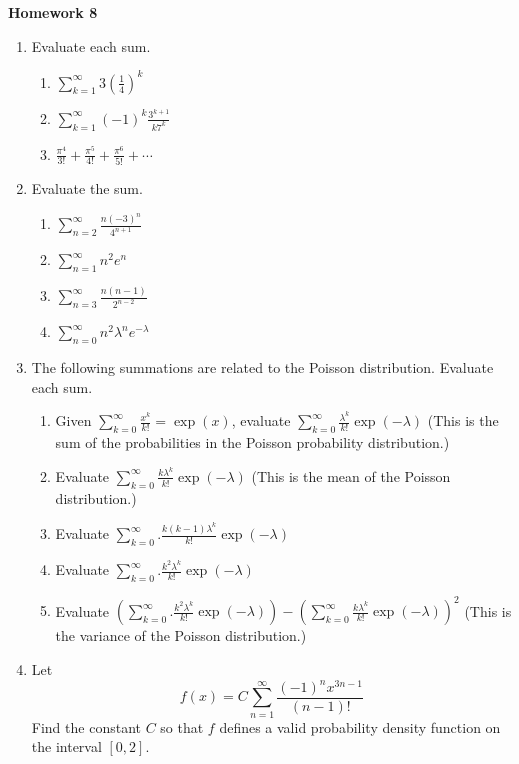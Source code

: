 \documentclass{article}
\begin{document}
\begin{center}
    \large \textbf{Homework 8}
\end{center}
                \begin{enumerate}
                    \item Evaluate each sum.
                        \begin{enumerate}
                            \item $ \sum_{k=1}^\infty 3\left(\frac{1}{4}\right)^k$
                            \item $ \sum_{k=1}^\infty (-1)^{k}\frac{3^{k+1}}{k7^k}$
                            \item $ \frac{\pi^4}{3!}+\frac{\pi^5}{4!}+\frac{\pi^6}{5!}+\cdots$
                        \end{enumerate}
                    \item Evaluate the sum.
                        \begin{enumerate}
                            \item $ \sum_{n=2}^\infty \frac{n(-3)^n}{4^{n+1}}$
                            \item $ \sum_{n=1}^\infty {n^2e^n}$
                            \item $ \sum_{n=3}^\infty \frac{n(n-1)}{2^{n-2}}$
                            \item $ \sum_{n=0}^\infty n^2\lambda^n e^{-\lambda}$ 
                        \end{enumerate}
                    \item The following summations are related to the Poisson distribution.  Evaluate each sum.
                        \begin{enumerate}
                            \item Given $ \sum_{k=0}^\infty \frac{x^k}{k!}=\exp(x)$, evaluate $\sum_{k=0}^\infty \frac{\lambda^k}{k!}\exp(-\lambda)$  (This is the sum of the probabilities in the Poisson probability distribution.)
                            \item Evaluate $ \sum_{k=0}^\infty \frac{k\lambda^k}{k!}\exp(-\lambda)$ (This is the mean of the Poisson distribution.)
                            \item Evaluate $ \sum_{k=0}^\infty. \frac{k(k-1)\lambda^k}{k!}\exp(-\lambda)$
                            \item Evaluate $ \sum_{k=0}^\infty. \frac{k^2\lambda^k}{k!}\exp(-\lambda)$
                            \item Evaluate $ \left( \sum_{k=0}^\infty. \frac{k^2\lambda^k}{k!}\exp(-\lambda)\right) - \left(\sum_{k=0}^\infty \frac{k\lambda^k}{k!}\exp(-\lambda)\right)^2$ (This is the variance of the Poisson distribution.)
                        \end{enumerate}
                    \item Let $$ f(x)= C\sum_{n=1}^\infty \frac{(-1)^nx^{3n-1}}{(n-1)!}$$  Find the constant $C$ so that $f$ defines a valid probability density function on the interval $[0,2]$.
                \end{enumerate}
\end{document}
